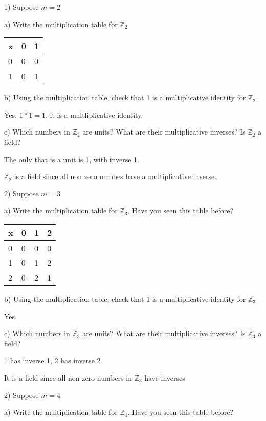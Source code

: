 \documentclass[11pt]{article}
\begin{document}
\begin{itemize}
	1) Suppose $m = 2$
	
		a) Write the multiplication table for $\mathbb{Z}_2$

\begin{tabular}{l|l l}

x & 0 & 1 \\
\hline
0 & 0	& 0 \\
1	& 0	& 1 \\

\end{tabular}

		b) Using the multiplication table, check that 1 is a multiplicative identity for $\mathbb{Z}_2$

		Yes, $1 * 1 = 1$, it is a multliplicative identity.

		c) Which numbers in $\mathbb{Z}_2$ are units? What are their multiplicative inverses? Is $\mathbb{Z}_2$ a field?

	The only that is a unit is 1, with inverse 1.

	$\mathbb{Z}_2$ is a field since all non zero numbes have a multiplicative inverse.

	2) Suppose $m = 3$

		a) Write the multiplication table for $\mathbb{Z}_3$. Have you seen this table before?


\begin{tabular}{l|l l l }

x & 0 & 1 & 2 \\

\hline

0 & 0	& 0 & 0 \\

1	& 0	& 1 & 2 \\

2	& 0	&	2	&	1 \\

\end{tabular}

		b) Using the multiplication table, check that 1 is a multiplicative identity for $\mathbb{Z}_3$

		Yes.

		c) Which numbers in $\mathbb{Z}_3$ are units? What are their multiplicative inverses? Is $\mathbb{Z}_3$ a field?

		1 has inverse 1, 2 has inverse 2

		It is a field since all non zero numbers in $\mathbb{Z}_3$ have inverses

	2) Suppose $m = 4$

		a) Write the multiplication table for $\mathbb{Z}_4$. Have you seen this table before?


\end{itemize}
\end{document}
